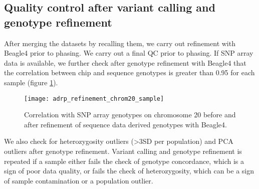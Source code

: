 \subsection{Quality control after variant calling and genotype refinement}
After merging the datasets by recalling them, we carry out refinement with Beagle4 prior to phasing. We carry out a final QC prior to phasing. If SNP array data is available, we further check after genotype refinement with Beagle4 that the correlation between chip and sequence genotypes is greater than 0.95 for each sample (figure \ref{fig:adrp_refinement_chrom20_sample}).

\begin{figure}[htbp]
\centering
\texttt{[image: adrp\_refinement\_chrom20\_sample]}
\caption{Correlation with SNP array genotypes on chromosome 20 before and after refinement of sequence data derived genotypes with Beagle4.}
\label{fig:adrp_refinement_chrom20_sample}
\end{figure}

We also check for heterozygosity outliers (\textgreater3SD per population) and PCA outliers after genotype refinement. Variant calling and genotype refinement is repeated if a sample either fails the check of genotype concordance, which is a sign of poor data quality, or fails the check of heterozygosity, which can be a sign of sample contamination or a population outlier.